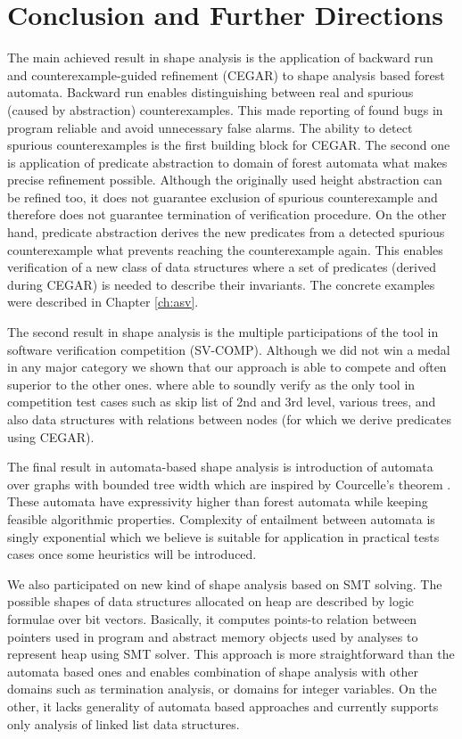 {\chapter{Conclusion and Further Directions}
\label{ch:concl}
The main achieved result in shape analysis is
the application of backward run and counterexample-guided refinement (CEGAR) to shape
analysis based forest automata.
Backward run enables distinguishing between real and spurious (caused by abstraction) counterexamples.
This made reporting of found bugs in program reliable and avoid unnecessary false alarms.
The ability to detect spurious counterexamples is the first building block for CEGAR.
The second one is application of predicate abstraction to domain of forest automata what makes precise refinement possible.
Although the originally used height abstraction can be refined too, it does not guarantee
exclusion of spurious counterexample and therefore does not guarantee termination of verification procedure.
On the other hand, predicate abstraction derives the new predicates from a detected spurious counterexample
what prevents reaching the counterexample again.
This enables verification of a new class of data structures where a set of predicates (derived during CEGAR)
is needed to describe their invariants.
The concrete examples were described in Chapter \ref{ch:asv}.

The second result in shape analysis is the multiple participations of the \forester
tool in software verification competition (SV-COMP).
Although we did not win a medal in any major category we shown that our approach
is able to compete and often superior to the other ones.
\forester where able to soundly verify as the only tool in competition test cases
such as skip list of 2nd and 3rd level, various trees,
and also data structures with relations between nodes (for which we derive predicates using CEGAR).

The final result in automata-based shape analysis is introduction of automata over graphs
with bounded tree width which are inspired by Courcelle's theorem \cite{courcell_graph_2012}.
These automata have expressivity higher than forest automata while keeping
feasible algorithmic properties.
Complexity of entailment between automata is singly exponential which we believe
is suitable for application in practical tests cases once some heuristics will be introduced.

We also participated on new kind of shape analysis based on SMT solving.
The possible shapes of data structures allocated on heap are described by logic formulae over bit
vectors.
Basically, it computes points-to relation between pointers used in program and abstract memory
objects used by analyses to represent heap using SMT solver.
This approach is more straightforward than the automata based ones and enables combination of
shape analysis with other domains such as termination analysis, or domains for integer variables.
On the other, it lacks generality of automata based approaches and currently supports
only analysis of linked list data structures.

}
